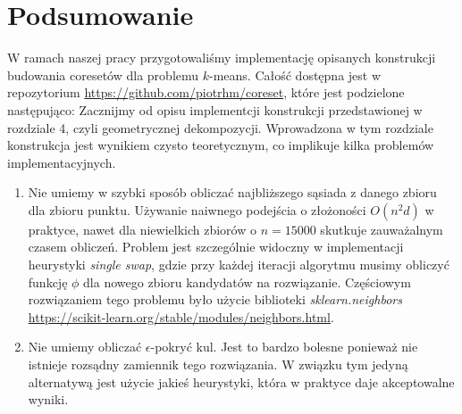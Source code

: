 \chapter{Podsumowanie}\label{analysis}

W ramach naszej pracy przygotowaliśmy implementację opisanych konstrukcji budowania coresetów dla problemu $k$-means.
Całość dostępna jest w repozytorium \url{https://github.com/piotrhm/coreset}, które jest podzielone następująco:
\noindent
Zacznijmy od opisu implementcji konstrukcji przedstawionej w rozdziale 4, czyli geometrycznej dekompozycji.
Wprowadzona w tym rozdziale konstrukcja jest wynikiem czysto teoretycznym, co implikuje kilka problemów implementacyjnych.
\begin{enumerate}
    \item Nie umiemy w szybki sposób obliczać najbliższego sąsiada z danego zbioru dla zbioru punktu.
    Używanie naiwnego podejścia o złożoności $O(n^2d)$ w praktyce, nawet dla niewielkich zbiorów o $n=15000$ skutkuje zauważalnym czasem obliczeń.
    Problem jest szczególnie widoczny w implementacji heurystyki \textit{single swap}, gdzie przy każdej iteracji algorytmu musimy obliczyć funkcję $\phi$ dla nowego zbioru kandydatów na rozwiązanie.
    Częściowym rozwiązaniem tego problemu było użycie biblioteki \textit{sklearn.neighbors} \url{https://scikit-learn.org/stable/modules/neighbors.html}.
    \item Nie umiemy obliczać $\epsilon$-pokryć kul.
    Jest to bardzo bolesne ponieważ nie istnieje rozsądny zamiennik tego rozwiązania.
    W związku tym jedyną alternatywą jest użycie jakieś heurystyki, która w praktyce daje akceptowalne wyniki.
\end{enumerate}

